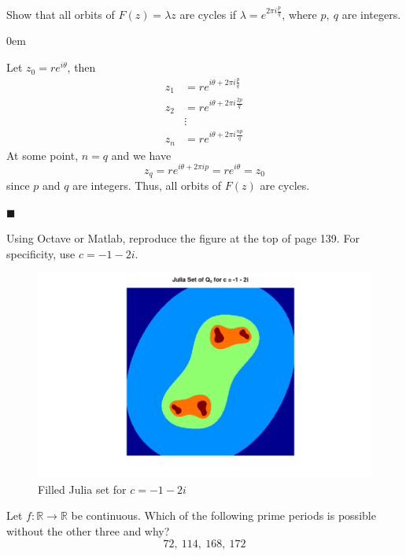 \documentclass[12pt]{article}
\author{Warren Atkison}
\date{\today}
\renewcommand{\qed}{\hfill$\blacksquare$}
\renewenvironment{proof}{\vspace{1em}\begin{addmargin}[2em]{0em}\begin{newproof}}{\end{newproof}\end{addmargin}\qed}
\newenvironment{problem}[2][Problem]{\begin{trivlist}
\item[\hskip \labelsep {\bfseries #1} \hskip \labelsep {\bfseries #2.}]}{\end{trivlist}}
\begin{document}
\fancyhf{}
\fancyhead[R]{\today}
\fancyfoot[R]{\thepage}

\begin{tcolorbox}[colback = blue!5!white,colframe = blue!75!black]
	\begin{problem}{1}
		Show that all orbits of $F(z) = \lambda z$ are cycles if $\lambda = e^{2\pi i\frac{p}{q}}$, where $p,~q$ are integers.
	\end{problem}
\end{tcolorbox}
\begin{proof}
	Let $z_0 = re^{i\theta}$, then
	\begin{align*}
		z_1 &= re^{i\theta + 2\pi i \frac{p}{q}} \\
		z_2 &= re^{i\theta + 2\pi i \frac{2p}{q}} \\
		    &\vdots \\
		z_n &= re^{i\theta + 2\pi i \frac{np}{q}}
	\end{align*}
	At some point, $n = q$ and we have
	\[
		z_q = re^{i\theta + 2\pi i p} = re^{i\theta} = z_0
	\]
	since $p$ and $q$ are integers. Thus, all orbits of $F(z)$ are cycles.
\end{proof}
\begin{tcolorbox}[colback = blue!5!white,colframe = blue!75!black]
	\begin{problem}{2}
		Using Octave or Matlab, reproduce the figure at the top of page 139. For specificity, use $c = -1 - 2i$.
	\end{problem}
\end{tcolorbox}
	
\begin{figure}[h]
	\begin{center}
	\includegraphics[scale = .3]{FigEX2.2.png}
	\caption{Filled Julia set for $c = -1-2i$}
	\end{center}
\end{figure}
\begin{tcolorbox}[colback=blue!5!white,colframe=blue!75!black]
	\begin{problem}{3a}
		Let $f: \mathbb{R} \to \mathbb{R}$ be continuous. Which of the following prime periods is possible without the other three and why?
		\[
			72,~114,~168,~172
		\]
	\end{problem}
\end{tcolorbox}
\end{document}
